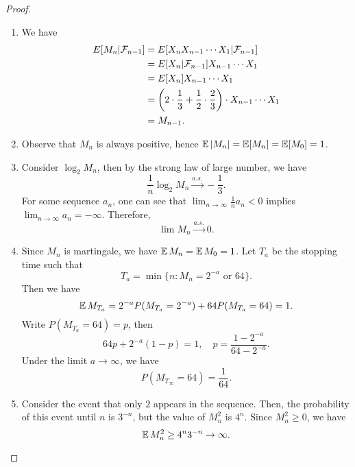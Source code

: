 \documentclass[a4paper]{article}\usepackage{amsmath,amssymb,amsthm,tikz,hyperref,mathtools,mathrsfs}
\begin{document}
\begin{proof}
  \begin{enumerate}
    \item We have
    \begin{align*}
      E[M_n | \mathcal{F}_{n-1}] &= E[X_n X_{n-1} \cdots X_1 | \mathcal{F}_{n-1}]
      \\
      {} &= E[X_n | \mathcal{F}_{n-1}] X_{n-1} \cdots X_1
      \\
      {} &= E[X_n] X_{n-1} \cdots X_1
      \\
      {} &= \left( 2 \cdot \frac{1}{3} + \frac{1}{2} \cdot \frac{2}{3} \right) \cdot X_{n-1} \cdots X_1
      \\
      {} &= M_{n-1}.
    \end{align*}
    \item Observe that $M_n$ is always positive, hence $\operatorname*{\mathbb{E}}|M_n| = \operatorname*{\mathbb{E}}[M_n] = \operatorname*{\mathbb{E}}[M_0] = 1$.
    \item Consider $\log_2 M_n$, then by the strong law of large number, we have
    \[
      \frac{1}{n} \log_2 M_n \stackrel{a.s.}{\to} - \frac{1}{3}.
    \]
    For some sequence $a_n$, one can see that $\lim_{n \to \infty} \frac{1}{n} a_n < 0$ implies $\lim_{n \to \infty} a_n = -\infty$.
    Therefore,
    \[
      \lim M_n \stackrel{a.s.}{\to} 0.
    \] 
    \item Since $M_n$ is martingale, we have $\operatorname*{\mathbb{E}} M_n = \operatorname*{\mathbb{E}} M_0 = 1$.
    Let $T_a$ be the stopping time such that
    \[
      T_a = \min \{n : M_n = 2^{-a} \text{ or } 64\}.
    \]
    Then we have
    \[
      \operatorname*{\mathbb{E}} M_{T_a} = 2^{-a} P(M_{T_a} = 2^{-a}) + 64 P(M_{T_a} = 64) = 1.
    \]
    Write $P(M_{T_a} = 64) = p$, then
    \[
      64 p + 2^{-a} (1-p) = 1, \quad p = \frac{1 - 2^{-a}}{64 - 2^{-a}}.
    \]
    Under the limit $a \to \infty$, we have 
    \[
      P(M_{T_\infty} = 64) = \frac{1}{64}.
    \]
    \item Consider the event that only $2$ appears in the sequence. 
    Then, the probability of this event until $n$ is $3^{-n}$, but the value of $M_n^2$ is $4^n$.
    Since $M_n^2 \ge 0$, we have
    \[
      \operatorname*{\mathbb{E}} M_n^2 \ge 4^n 3^{-n} \to \infty.
    \]
  \end{enumerate}
\end{proof}
\end{document}
